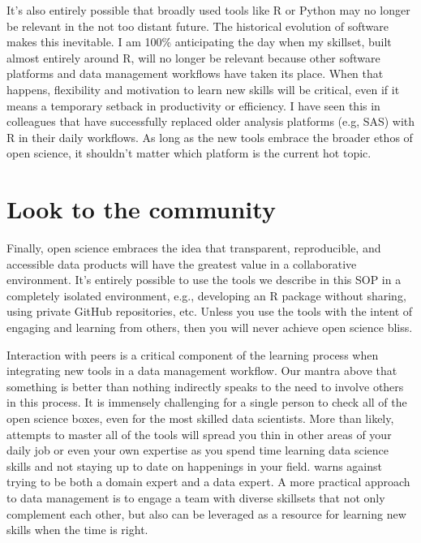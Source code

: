 \documentclass[
]{book}
\begin{document}
It's also entirely possible that broadly used tools like R or Python may no longer be relevant in the not too distant future. The historical evolution of software makes this inevitable. I am 100\% anticipating the day when my skillset, built almost entirely around R, will no longer be relevant because other software platforms and data management workflows have taken its place. When that happens, flexibility and motivation to learn new skills will be critical, even if it means a temporary setback in productivity or efficiency. I have seen this in colleagues that have successfully replaced older analysis platforms (e.g, SAS) with R in their daily workflows. As long as the new tools embrace the broader ethos of open science, it shouldn't matter which platform is the current hot topic.

\hypertarget{look-to-the-community}{%
\section{Look to the community}\label{look-to-the-community}}

Finally, open science embraces the idea that transparent, reproducible, and accessible data products will have the greatest value in a collaborative environment. It's entirely possible to use the tools we describe in this SOP in a completely isolated environment, e.g., developing an R package without sharing, using private GitHub repositories, etc. Unless you use the tools with the intent of engaging and learning from others, then you will never achieve open science bliss.

Interaction with peers is a critical component of the learning process when integrating new tools in a data management workflow. Our mantra above that something is better than nothing indirectly speaks to the need to involve others in this process. It is immensely challenging for a single person to check all of the open science boxes, even for the most skilled data scientists. More than likely, attempts to master all of the tools will spread you thin in other areas of your daily job or even your own expertise as you spend time learning data science skills and not staying up to date on happenings in your field. \citet{Mons18} warns against trying to be both a domain expert and a data expert. A more practical approach to data management is to engage a team with diverse skillsets that not only complement each other, but also can be leveraged as a resource for learning new skills when the time is right.
\end{document}
